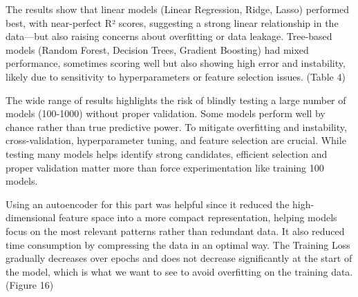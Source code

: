 \documentclass[
  letterpaper,
  DIV=11,
  numbers=noendperiod]{scrartcl}
\begin{document}
The results show that linear models (Linear Regression, Ridge, Lasso)
performed best, with near-perfect R² scores, suggesting a strong linear
relationship in the data---but also raising concerns about overfitting
or data leakage. Tree-based models (Random Forest, Decision Trees,
Gradient Boosting) had mixed performance, sometimes scoring well but
also showing high error and instability, likely due to sensitivity to
hyperparameters or feature selection issues. (Table 4)

The wide range of results highlights the risk of blindly testing a large
number of models (100-1000) without proper validation. Some models
perform well by chance rather than true predictive power. To mitigate
overfitting and instability, cross-validation, hyperparameter tuning,
and feature selection are crucial. While testing many models helps
identify strong candidates, efficient selection and proper validation
matter more than force experimentation like training 100 models.

Using an autoencoder for this part was helpful since it reduced the
high-dimensional feature space into a more compact representation,
helping models focus on the most relevant patterns rather than redundant
data. It also reduced time consumption by compressing the data in an
optimal way. The Training Loss gradually decreases over epochs and does
not decrease significantly at the start of the model, which is what we
want to see to avoid overfitting on the training data. (Figure 16)
\end{document}
